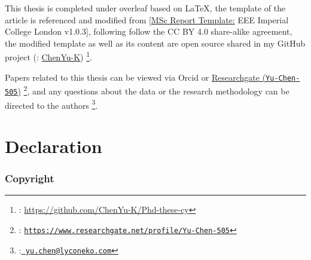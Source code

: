 This thesis is completed under overleaf based on \LaTeX, the template of the article is referenced and modified from [\hyperlink{https://www.overleaf.com/latex/templates/msc-report-template-eee-imperial-college-london-v1-dot-0-3/qtkpngktpwpw}{MSc Report Template:} EEE Imperial College London v1.0.3], following follow the CC BY 4.0 share-alike agreement, the modified template as well as its content are open source shared in my GitHub project (\faGithub : \hyperlink{https://github.com/ChenYu-K/Phd-these-cy}{ChenYu-K}) \footnote{\faGithub : \url{https://github.com/ChenYu-K/Phd-these-cy}}.

Papers related to this thesis can be viewed via Orcid  or \hyperlink{https://www.researchgate.net/profile/Yu-Chen-505}{Researchgate (\texttt{Yu-Chen-505})} \footnote{\aiResearchGate: {\href{https://www.researchgate.net/profile/Yu-Chen-505}{\texttt{https://www.researchgate.net/profile/Yu-Chen-505}}}}, and any questions about the data or the research methodology can be directed to the authors \footnote{\faEnvelope:{\href{mailto:yu.chen@lyconeko.com}{\texttt{ yu.chen@lyconeko.com}}}}.






\cleardoublepage{}
{}\mtcaddchapter 
\chapter*{Declaration}
\addtocounter{counter}{-1}


\subsection*{Copyright}

